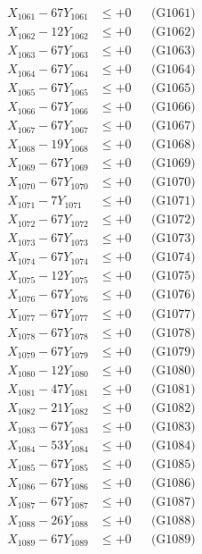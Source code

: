 \documentclass[a4paper,10pt]{article}
\begin{document}
{\begin{align}
X_{1061} - 67Y_{1061} &\leq +0 && \text{(G1061)} \\
X_{1062} - 12Y_{1062} &\leq +0 && \text{(G1062)} \\
X_{1063} - 67Y_{1063} &\leq +0 && \text{(G1063)} \\
X_{1064} - 67Y_{1064} &\leq +0 && \text{(G1064)} \\
X_{1065} - 67Y_{1065} &\leq +0 && \text{(G1065)} \\
X_{1066} - 67Y_{1066} &\leq +0 && \text{(G1066)} \\
X_{1067} - 67Y_{1067} &\leq +0 && \text{(G1067)} \\
X_{1068} - 19Y_{1068} &\leq +0 && \text{(G1068)} \\
X_{1069} - 67Y_{1069} &\leq +0 && \text{(G1069)} \\
X_{1070} - 67Y_{1070} &\leq +0 && \text{(G1070)} \\
\allowbreak
X_{1071} - 7Y_{1071} &\leq +0 && \text{(G1071)} \\
X_{1072} - 67Y_{1072} &\leq +0 && \text{(G1072)} \\
X_{1073} - 67Y_{1073} &\leq +0 && \text{(G1073)} \\
X_{1074} - 67Y_{1074} &\leq +0 && \text{(G1074)} \\
X_{1075} - 12Y_{1075} &\leq +0 && \text{(G1075)} \\
X_{1076} - 67Y_{1076} &\leq +0 && \text{(G1076)} \\
X_{1077} - 67Y_{1077} &\leq +0 && \text{(G1077)} \\
X_{1078} - 67Y_{1078} &\leq +0 && \text{(G1078)} \\
X_{1079} - 67Y_{1079} &\leq +0 && \text{(G1079)} \\
X_{1080} - 12Y_{1080} &\leq +0 && \text{(G1080)} \\
\allowbreak
X_{1081} - 47Y_{1081} &\leq +0 && \text{(G1081)} \\
X_{1082} - 21Y_{1082} &\leq +0 && \text{(G1082)} \\
X_{1083} - 67Y_{1083} &\leq +0 && \text{(G1083)} \\
X_{1084} - 53Y_{1084} &\leq +0 && \text{(G1084)} \\
X_{1085} - 67Y_{1085} &\leq +0 && \text{(G1085)} \\
X_{1086} - 67Y_{1086} &\leq +0 && \text{(G1086)} \\
X_{1087} - 67Y_{1087} &\leq +0 && \text{(G1087)} \\
X_{1088} - 26Y_{1088} &\leq +0 && \text{(G1088)} \\
X_{1089} - 67Y_{1089} &\leq +0 && \text{(G1089)} \\

\end{align}}
\end{document}
